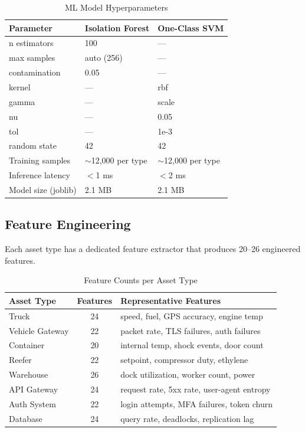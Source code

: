 \documentclass[12pt,a4paper]{amritareport}
\begin{document}
\begin{table}[H]
\centering
\caption{ML Model Hyperparameters}
\label{tab:ml}
\begin{tabular}{@{}lll@{}}
\toprule
\textbf{Parameter} & \textbf{Isolation Forest} & \textbf{One-Class SVM} \\
\midrule
n estimators & 100 & --- \\
max samples & auto (256) & --- \\
contamination & 0.05 & --- \\
kernel & --- & rbf \\
gamma & --- & scale \\
nu & --- & 0.05 \\
tol & --- & 1e-3 \\
random state & 42 & 42 \\
Training samples & $\sim$12,000 per type & $\sim$12,000 per type \\
Inference latency & $<$1 ms & $<$2 ms \\
Model size (joblib) & 2.1 MB & 2.1 MB \\
\bottomrule
\end{tabular}
\end{table}

\subsection{Feature Engineering}

Each asset type has a dedicated feature extractor that produces 20--26 engineered features.

\begin{table}[H]
\centering
\caption{Feature Counts per Asset Type}
\label{tab:features}
\begin{tabular}{@{}lcP{6.4cm}@{}}
\toprule
\textbf{Asset Type} & \textbf{Features} & \textbf{Representative Features} \\
\midrule
Truck & 24 & speed, fuel, GPS accuracy, engine temp \\
Vehicle Gateway & 22 & packet rate, TLS failures, auth failures \\
Container & 20 & internal temp, shock events, door count \\
Reefer & 22 & setpoint, compressor duty, ethylene \\
Warehouse & 26 & dock utilization, worker count, power \\
API Gateway & 24 & request rate, 5xx rate, user-agent entropy \\
Auth System & 22 & login attempts, MFA failures, token churn \\
Database & 24 & query rate, deadlocks, replication lag \\
\bottomrule
\end{tabular}
\end{table}
\end{document}
